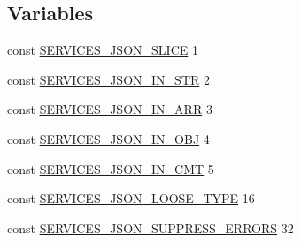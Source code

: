 \subsection*{Variables}
\begin{DoxyCompactItemize}
\item 
const \hyperlink{include_2json_8php_a1e79ff1fd74e07c4ccdcd0b80e43ea04}{S\-E\-R\-V\-I\-C\-E\-S\-\_\-\-J\-S\-O\-N\-\_\-\-S\-L\-I\-C\-E} 1
\item 
const \hyperlink{include_2json_8php_ab05e1b32faca0c11f3843141c2e89f40}{S\-E\-R\-V\-I\-C\-E\-S\-\_\-\-J\-S\-O\-N\-\_\-\-I\-N\-\_\-\-S\-T\-R} 2
\item 
const \hyperlink{include_2json_8php_a800e29918ef4103a764768fd9fba3f76}{S\-E\-R\-V\-I\-C\-E\-S\-\_\-\-J\-S\-O\-N\-\_\-\-I\-N\-\_\-\-A\-R\-R} 3
\item 
const \hyperlink{include_2json_8php_a3c58eb6f6956ee76d47965de616827a3}{S\-E\-R\-V\-I\-C\-E\-S\-\_\-\-J\-S\-O\-N\-\_\-\-I\-N\-\_\-\-O\-B\-J} 4
\item 
const \hyperlink{include_2json_8php_a6061c244fdf8c7c5d6423814af6ecb07}{S\-E\-R\-V\-I\-C\-E\-S\-\_\-\-J\-S\-O\-N\-\_\-\-I\-N\-\_\-\-C\-M\-T} 5
\item 
const \hyperlink{include_2json_8php_a05615b32a21d38e71227831a102e0275}{S\-E\-R\-V\-I\-C\-E\-S\-\_\-\-J\-S\-O\-N\-\_\-\-L\-O\-O\-S\-E\-\_\-\-T\-Y\-P\-E} 16
\item 
const \hyperlink{include_2json_8php_ae614918331d7f14a4da9de624af7df33}{S\-E\-R\-V\-I\-C\-E\-S\-\_\-\-J\-S\-O\-N\-\_\-\-S\-U\-P\-P\-R\-E\-S\-S\-\_\-\-E\-R\-R\-O\-R\-S} 32
\end{DoxyCompactItemize}


